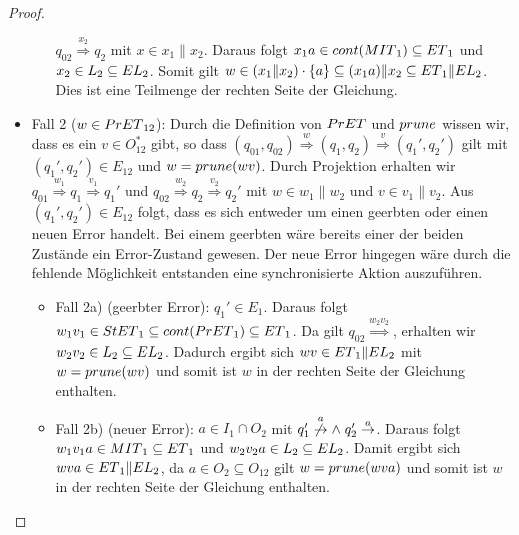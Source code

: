 \begin{proof}
\begin{itemize}
\begin{itemize}
      $q_{02}\overset{x_2}{\Rightarrow} q_2$ mit $x\in x_1\|x_2$. Daraus folgt
      $x_1a\in cont{}(MIT{}_1)\subseteq ET{}_1$ und $x_2\in L_2\subseteq EL{}_2$. Somit
      gilt $w\in (x_1\| x_2)\cdot\{a\}\subseteq (x_1a)\|x_2\subseteq ET{}_1\|EL{}_2$.
      Dies ist eine Teilmenge der rechten Seite der Gleichung.
  \end{itemize}
    \item Fall 2 ($w\in PrET{}_{12}$): Durch die Definition von $PrET{}$ und $prune{}$
      wissen wir, dass es ein $v\in O_{12}^*$ gibt, so dass $(q_{01},q_{02})
      \overset{w}{\Rightarrow} (q_1,q_2) \overset{v}{\Rightarrow} (q_1',q_2')$
      gilt mit $(q_1',q_2')\in E_{12}$ und $w=prune{}(wv)$. Durch Projektion
      erhalten wir $q_{01} \overset{w_1}{\Rightarrow} q_1
      \overset{v_1}{\Rightarrow} q_1'$ und $q_{02} \overset{w_2}{\Rightarrow}
      q_2 \overset{v_2}{\Rightarrow} q_2'$ mit $w\in w_1\|w_2$ und $v\in
      v_1\|v_2$. Aus $(q_1',q_2')\in E_{12}$ folgt, dass es sich entweder um
      einen geerbten oder einen neuen Error handelt. Bei einem geerbten wäre
      bereits einer der beiden Zustände ein Error-Zustand gewesen. Der neue
      Error hingegen wäre durch die fehlende Möglichkeit
      entstanden eine synchronisierte Aktion auszuführen.
      \begin{itemize}
        \item Fall 2a) (geerbter Error): \OBdA{} $q_1'\in E_1$. Daraus folgt
          $w_1v_1\in StET{}_1\subseteq cont{}(PrET{}_1)\subseteq ET{}_1$. Da gilt
          $q_{02}\overset{w_2v_2}{\Rightarrow}$, erhalten wir $w_2v_2\in
          L_2\subseteq EL{}_2$. Dadurch ergibt sich $wv\in ET{}_1\|EL{}_2$ mit
          $w=prune{}(wv)$ und somit ist $w$ in der rechten Seite der Gleichung
          enthalten.
        \item Fall 2b) (neuer Error): \OBdA{} $a\in I_1\cap O_2$ mit
          $q_1'\overset{a}{\not{\hspace{-0.1cm}\rightarrow}} \wedge \; q_2'
          \overset{a}{\rightarrow}$. Daraus folgt $w_1v_1a\in MIT{}_1\subseteq
          ET{}_1$ und $w_2v_2a\in L_2\subseteq EL{}_2$. Damit ergibt sich $wva\in
          ET{}_1\|EL{}_2$, da $a\in O_2\subseteq O_{12}$ gilt $w=prune{}(wva)$ und
          somit ist $w$ in der rechten Seite der Gleichung enthalten.
      \end{itemize}
  \end{itemize}


\end{proof}
